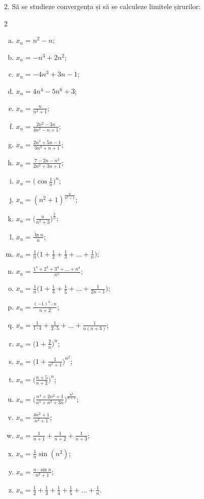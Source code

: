 \documentclass[11pt,a4paper]{article}
\theoremstyle{dotless}
\theoremstyle{dotlessdr}
\begin{document}
2. Să se studieze convergența și să se calculeze limitele șirurilor:
\begin{multicols}{2}
\begin{enumerate}[(a)]
  \item $x_n = n^2 - n$;
  \item $x_n = -n^3 + 2n^2$;
  \item $x_n = -4n^3 + 3n - 1$;
  \item $x_n = 4n^4 - 5n^6 + 3$;
  \item $x_n = \frac{n}{n^2 + 1}$;
  \item $x_n = \frac{2n^2 - 3n}{4n^2 - n + 1}$;
  \item $x_n = \frac{2n^3 + 5n - 1}{3n^2 + n + 1}$;
  \item $x_n = \frac{7 - 2n - n^3}{2n^2 + 3n + 1}$;
  \item $x_n = \Big(\cos \frac{1}{n} \Big)^n$;
  \item $x_n = (n^2 + 1)^{\frac{n}{n^2 + 1}}$;
  \item $x_n = \Big( \frac{n}{n^2 + 3} \Big)^{\frac{2}{n}}$;
  \item $x_n = \frac{\ln n}{n}$;
  \item $x_n = \frac{1}{n} \Big(1 + \frac{1}{2} + \frac{1}{3} + \dots + \frac{1}{n} \Big)$;
  \item $x_n = \frac{1^4 + 2^4 + 3^4 + \dots + n^4}{n^5}$;
  \item $x_n = \frac{1}{n} \Big( 1 + \frac{1}{3} + \frac{1}{5} + \dots + \frac{1}{2n - 1} \Big)$;
  \item $x_n = \frac{(-1)^n \cdot n}{n + 2}$;
  \item $x_n = \frac{1}{1 \cdot 4} + \frac{1}{2 \cdot 5} + \dots + \frac{1}{n(n + 3)}$;
  \item $x_n = \Big(1 + \frac{2}{n} \Big)^n$;
  \item $x_n = \Big(1 + \frac{1}{n^2 + 1} \Big)^{n^2}$;
  \item $x_n = \Big(\frac{n + 5}{n + 2} \Big)^n$;
  \item $x_n = \Big( \frac{n^4 + 2n^2 + 1}{n^4 + n^2 + 3n} \Big)^{\frac{n^2}{n + 1}}$;
  \item $x_n = \frac{4n^2 + 1}{n^2 + 1}$;
  \item $x_n = \frac{1}{n + 1} + \frac{1}{n + 2} + \frac{1}{n + 3}$;
  \item $x_n = \frac{1}{n} \sin(n^2)$;
  \item $x_n = \frac{n \cdot \sin n}{n^2 + 1}$;
  \item $x_n = \frac{1}{2} + \frac{1}{3} + \frac{1}{4} + \frac{1}{5} + \dots + \frac{1}{n}$.
\end{enumerate}
\end{multicols}
\end{document}

